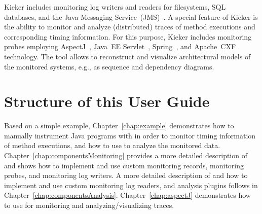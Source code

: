Kieker includes monitoring log writers and readers for filesystems, SQL %
databases, and the Java Messaging Service~(JMS)~\cite{JMS-WebSite}. %
A special feature of Kieker is the ability to monitor and analyze (distributed) %
traces of method executions and corresponding timing information. %
For this purpose, Kieker includes monitoring probes employing %
AspectJ~\cite{AspectJ-WebSite}, %
Java~EE Servlet~\cite{JavaServletTechnology-WebSite}, %
Spring~\cite{Spring-WebSite}, and %
Apache~CXF~\cite{CXF-WebSite} technology. %
The \KiekerTraceAnalysis{} tool allows to reconstruct and visualize %
architectural models of the monitored systems, e.g., as sequence and %
dependency diagrams.

\section{Structure of this User Guide}

Based on a simple example, Chapter~\ref{chap:example} demonstrates %
how to manually instrument Java programs with \KiekerMonitoringPart{} %
in order to monitor timing information of method executions, and %
how to use \KiekerAnalysisPart{} to analyze the monitored data. %
Chapter~\ref{chap:componentsMonitoring} provides a more detailed %
description of \KiekerMonitoringPart{} and shows how to implement and %
use custom monitoring records, monitoring probes, and monitoring log writers. %
A more detailed description of \KiekerAnalysisPart{} and how to implement and use %
custom monitoring log readers, and analysis plugins follows in %
Chapter~\ref{chap:componentsAnalysis}. %
Chapter~\ref{chap:aspectJ} demonstrates how to use \KiekerTraceAnalysis{} %
for monitoring and analyzing/visualizing traces. %

\quad\\


